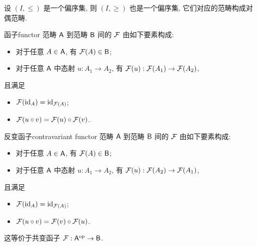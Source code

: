 \begin{example}
设 $(I,\le)$ 是一个偏序集, 则 $(I,\ge)$ 也是一个偏序集, 它们对应的范畴构成对偶范畴.
\end{example}

\begin{definition}{函子}{functor}
范畴 ${\mathsf{A}}$ 到范畴 ${\mathsf{B}}$ 间的 ${\mathcal{F}}$ 由如下要素构成:
\begin{itemize}
\item 对于任意 $A\in{\mathsf{A}}$, 有 ${\mathcal{F}}(A)\in{\mathsf{B}}$;
\item 对于任意 ${\mathsf{A}}$ 中态射 $u:A_1\to A_2$, 有 ${\mathcal{F}}(u):{\mathcal{F}}(A_1)\to{\mathcal{F}}(A_2)$,
\end{itemize}
且满足
\begin{itemize}
\item ${\mathcal{F}}({\mathrm{id}}_A)={\mathrm{id}}_{{\mathcal{F}}(A)}$;
\item ${\mathcal{F}}(u\circ v)={\mathcal{F}}(u)\circ {\mathcal{F}}(v)$.
\end{itemize}
\end{definition}

\begin{definition}{反变函子}{contravariant functor}
范畴 ${\mathsf{A}}$ 到范畴 ${\mathsf{B}}$ 间的 ${\mathcal{F}}$ 由如下要素构成:
\begin{itemize}
\item 对于任意 $A\in{\mathsf{A}}$, 有 ${\mathcal{F}}(A)\in{\mathsf{B}}$;
\item 对于任意 ${\mathsf{A}}$ 中态射 $u:A_1\to A_2$, 有 ${\mathcal{F}}(u):{\mathcal{F}}(A_2)\to{\mathcal{F}}(A_1)$,
\end{itemize}
且满足
\begin{itemize}
\item ${\mathcal{F}}({\mathrm{id}}_A)={\mathrm{id}}_{{\mathcal{F}}(A)}$;
\item ${\mathcal{F}}(u\circ v)={\mathcal{F}}(v)\circ {\mathcal{F}}(u)$.
\end{itemize}
这等价于共变函子 ${\mathcal{F}}:{\mathsf{A}}^{\mathrm{op}}\to{\mathsf{B}}$.
\end{definition}

